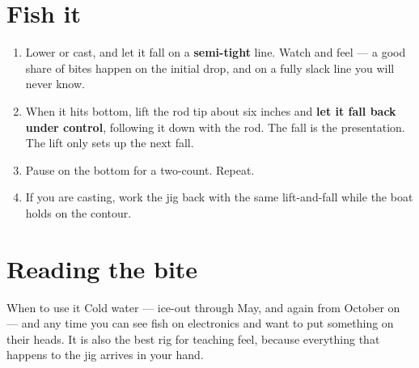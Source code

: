 \section{Fish it}
\begin{enumerate}
\item Lower or cast, and let it fall on a \textbf{semi-tight} line. Watch and feel --- a good share of bites happen on the initial drop, and on a fully slack line you will never know.
\item When it hits bottom, lift the rod tip about six inches and \textbf{let it fall back under control}, following it down with the rod. The fall is the presentation. The lift only sets up the next fall.
\item Pause on the bottom for a two-count. Repeat.
\item If you are casting, work the jig back with the same lift-and-fall while the boat holds on the contour.
\end{enumerate}

\section{Reading the bite}
\begin{telosfacts}[0.20]
\end{telosfacts}

\begin{telospanel}{When to use it}
Cold water --- ice-out through May, and again from October on --- and any time you can see fish on electronics and want to put something on their heads. It is also the best rig for teaching feel, because everything that happens to the jig arrives in your hand.
\end{telospanel}

